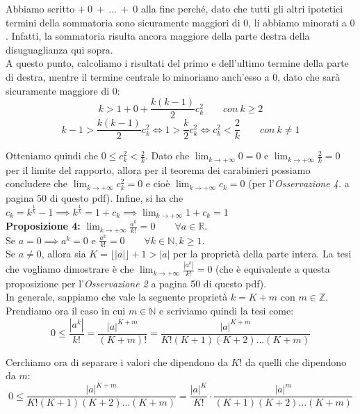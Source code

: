 \documentclass{article}
\begin{document}
\noindent Abbiamo scritto $+ \ 0 \ + \ ... \ + \ 0$ alla fine perché, dato che tutti gli altri ipotetici termini della sommatoria sono sicuramente maggiori di $0$, li abbiamo minorati a $0$. Infatti, la sommatoria risulta ancora maggiore della parte destra della disuguaglianza qui sopra. \\
A questo punto, calcoliamo i risultati del primo e dell'ultimo termine della parte di destra, mentre il termine centrale lo minoriamo anch'esso a $0$, dato che sarà sicuramente maggiore di $0$:
\begin{equation*}
    k > 1 + 0 + \frac{k(k - 1)}{2}c_k^2 \qquad con \ k \geq 2
\end{equation*}
\begin{equation*}
    k - 1 > \frac{k(k - 1)}{2}c_k^2 \iff 1 > \frac{k}{2} c_k^2 \iff c_k^2 < \frac{2}{k} \qquad con \ k \neq 1
\end{equation*}

\noindent Otteniamo quindi che $0 \leq c_k^2 < \frac{2}{k}$. Dato che $\lim_{k \to +\infty} 0 = 0$ e $\lim_{k \to +\infty} \frac{2}{k} = 0$ per il limite del rapporto, allora per il teorema dei carabinieri possiamo concludere che $\lim_{k \to +\infty} c_k^2 = 0$ e cioè $\lim_{k \to +\infty} c_k = 0$ (per l'\textit{Osservazione 4.} a pagina 50 di questo pdf). Infine, si ha che $c_k = k^\frac{1}{k} - 1 \implies k^\frac{1}{k} = 1 + c_k \implies \lim_{k \to +\infty} 1 + c_k = 1$\\

\noindent\textbf{Proposizione 4:} $\lim_{k \to +\infty} \frac{a^k}{k!} = 0 \qquad \forall a \in \mathbb{R}$.\\
Se $a = 0 \implies a^k = 0$ e $\frac{a^k}{k!} = 0 \qquad \forall k \in \mathbb{N}, k \geq 1$.\\
Se $a \neq 0$, allora sia $K = \lfloor |a| \rfloor + 1 > |a|$ per la proprietà della parte intera. La tesi che vogliamo dimostrare è che $\lim_{k \to +\infty} \frac{|a^k|}{k!} = 0$ (che è equivalente a questa proposizione per l'\textit{Osservazione 2} a pagina 50 di questo pdf).\\
In generale, sappiamo che vale la seguente proprietà $k = K + m$ con $m \in \mathbb{Z}$. Prendiamo ora il caso in cui $m \in \mathbb{N}$ e scriviamo quindi la tesi come:
\begin{equation*}
    0 \leq \frac{|a^k|}{k!} = \frac{|a|^{K + m}}{(K + m)!} = \frac{|a|^{K + m}}{K!(K + 1)(K + 2)...(K + m)}
\end{equation*}

\noindent Cerchiamo ora di separare i valori che dipendono da $K!$ da quelli che dipendono da $m$:
\begin{equation*}
    0 \leq \frac{|a|^{K + m}}{K!(K + 1)(K + 2)...(K + m)} = \frac{|a|^K}{K!} \cdot \frac{|a|^m}{(K + 1)(K + 2)...(K + m)}
\end{equation*}
\end{document}
